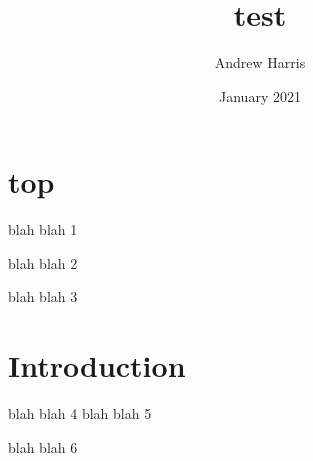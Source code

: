 \documentclass{article}
\title{test}
\author{Andrew Harris}
\date{January 2021}
\begin{document}
\maketitle
\section{top} 
blah blah 1

blah blah 2

blah blah 3


\section{Introduction}
blah blah 4
blah blah 5

blah blah 6
\end{document}
